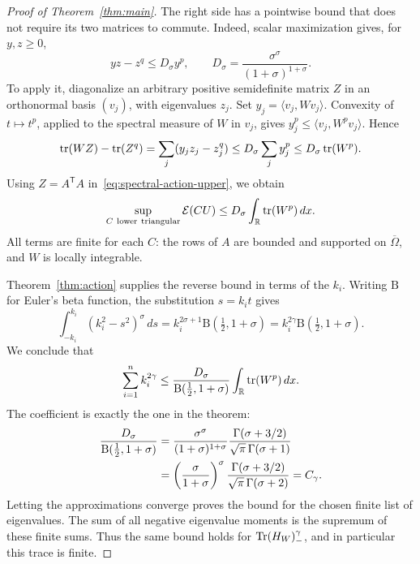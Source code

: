 \begin{proof}[Proof of Theorem~\ref{thm:main}]
The right side has a pointwise bound that does not require its two matrices to
commute.  Indeed, scalar maximization gives, for $y,z\geq0$,
\begin{equation}\label{eq:scalar-young-sharp}
 yz-z^q\leq D_\sigma y^p,
 \qquad D_\sigma=\frac{\sigma^\sigma}{(1+\sigma)^{1+\sigma}}.
\end{equation}
To apply it, diagonalize an arbitrary positive semidefinite matrix $Z$ in an
orthonormal basis $(v_j)$, with eigenvalues $z_j$.  Set
$y_j=\langle v_j,Wv_j\rangle$.  Convexity of $t\mapsto t^p$, applied to the
spectral measure of $W$ in $v_j$, gives
$y_j^p\leq\langle v_j,W^pv_j\rangle$.  Hence
\begin{equation}\label{eq:trace-young-sharp}
 \operatorname{tr}(WZ)-\operatorname{tr}(Z^q)
   =\sum_j(y_jz_j-z_j^q)
   \leq D_\sigma\sum_j y_j^p
   \leq D_\sigma\operatorname{tr}(W^p).
\end{equation}
Using $Z=A^{\mathsf T}A$ in~\eqref{eq:spectral-action-upper}, we obtain
\[
 \sup_{C\ \mathrm{lower\ triangular}}\mathcal E(CU)
    \leq D_\sigma\int_\R\tr(W^p)\,dx.
\]
All terms are finite for each $C$: the rows of $A$ are bounded and supported
on $\overline\Omega$, and $W$ is locally integrable.

Theorem~\ref{thm:action} supplies the reverse bound in terms of the $k_i$.
Writing $\mathrm B$ for Euler's beta function, the substitution $s=k_it$ gives
\[
 \int_{-k_i}^{k_i}(k_i^2-s^2)^\sigma\,ds
  =k_i^{2\sigma+1}\mathrm B(\tfrac12,1+\sigma)
  =k_i^{2\gamma}\mathrm B(\tfrac12,1+\sigma).
\]
We conclude that
\begin{equation}\label{eq:finite-spectral-moment}
 \sum_{i=1}^n k_i^{2\gamma}
   \leq\frac{D_\sigma}{\mathrm B(\tfrac12,1+\sigma)}
            \int_\mathbb R\operatorname{tr}(W^p)\,dx.
\end{equation}
The coefficient is exactly the one in the theorem:
\begin{align}
 \frac{D_\sigma}{\mathrm B(\tfrac12,1+\sigma)}
 &=\frac{\sigma^\sigma}{(1+\sigma)^{1+\sigma}}
       \frac{\Gamma(\sigma+3/2)}{\sqrt\pi\,\Gamma(\sigma+1)} \notag\\
 &=\left(\frac{\sigma}{1+\sigma}\right)^\sigma
       \frac{\Gamma(\sigma+3/2)}{\sqrt\pi\,\Gamma(\sigma+2)}
   =C_\gamma.                                           \label{eq:constant-identity}
\end{align}
Letting the approximations converge proves the bound for the chosen finite
list of eigenvalues.  The sum of all negative eigenvalue moments is the
supremum of these finite sums.  Thus the same bound holds for
$\operatorname{Tr}(H_W)_-^\gamma$, and in particular this trace is finite.


\end{proof}
